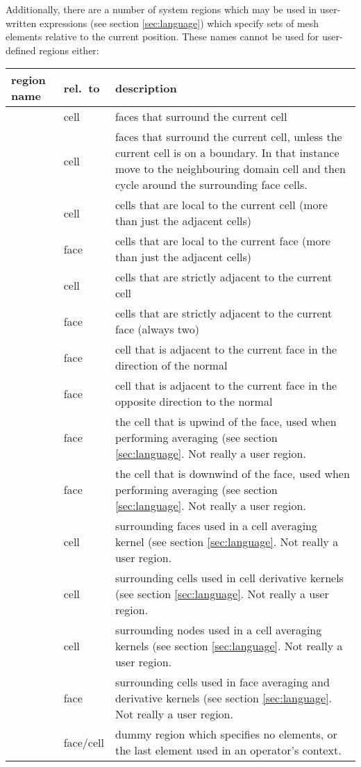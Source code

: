Additionally, there are a number of system regions which may be used in user-written expressions (see section \ref{sec:language}) which specify sets of mesh elements relative to the current position.  These names cannot be used for user-defined regions either:

\begin{center}
\begin{supertabular}{llp{8cm}} \hline
region name & rel.~to& description \\ \hline
{} & cell & faces that surround the current cell \\
 & cell & faces that surround the current cell, unless the current cell is on a boundary. In that instance move to the neighbouring domain cell and then cycle around the surrounding face cells.\\
 & cell & cells that are local to the current cell (more than just the adjacent cells)\\
 & face & cells that are local to the current face (more than just the adjacent cells)\\
 & cell & cells that are strictly adjacent to the current cell\\
 & face & cells that are strictly adjacent to the current face (always two)\\
 & face & cell that is adjacent to the current face in the direction of the normal\\
 & face & cell that is adjacent to the current face in the opposite direction to the normal\\
 & face & the cell that is upwind of the face, used when performing  averaging (see section \ref{sec:language}.  Not really a user region.\\
 & face & the cell that is downwind of the face, used when performing  averaging (see section \ref{sec:language}.  Not really a user region.\\
 & cell & surrounding faces used in a cell averaging kernel (see section \ref{sec:language}.  Not really a user region.\\
 & cell & surrounding cells used in cell derivative kernels (see section \ref{sec:language}.  Not really a user region.\\
 & cell & surrounding nodes used in a cell averaging kernels (see section \ref{sec:language}.  Not really a user region.\\
 & face & surrounding cells used in face averaging and derivative kernels (see section \ref{sec:language}.  Not really a user region.\\
 & face/cell & dummy region which specifies no elements, or the last element used in an operator's context.\\ \hline
\end{supertabular}
\end{center}

